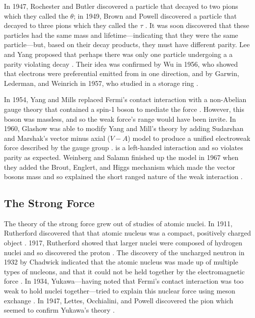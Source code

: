 In 1947, Rochester and Butler discovered a particle that decayed to two pions
which they called the $\theta$; in 1949, Brown and Powell discovered a particle
that decayed to three pions which they called the $\tau$
\cite{Rochester1947}\cite{brown1949}. It was soon discovered that these
particles had the same mass and lifetime---indicating that they were the same
particle---but, based on their decay products, they must have different parity.
Lee and Yang proposed that perhaps there was only one particle undergoing a  a
parity violating decay \cite{lee1956}. Their idea was confirmed by Wu in 1956, who
showed that electrons were preferential emitted from \cobaltsixty in one
direction, and by Garwin, Lederman, and Weinrich in 1957, who studied \pitomunu
in a storage ring \cite{wu1956}\cite{garwin1957}.

In 1954, Yang and Mills replaced Fermi's contact interaction with a non-Abelian
gauge theory that contained a spin-1 boson to mediate the force
\cite{yang1954}. However, this boson was massless, and so the weak force's
range would have been invite. In 1960, Glashow was able to modify Yang and
Mill's theory by adding Sudarshan and Marshak's vector minus axial ($V-A$)
model to produce a unified electroweak force described by the \SUtwoUone gauge
group \cite{glashow1961}\cite{sudarshan1958}. \SUtwo is a left-handed
interaction and so violates parity as expected. Weinberg and Salamn finished up
the model in 1967 when they added the Brout, Englert, and Higgs mechanism which
made the vector bosons mass and so explained the short ranged nature of the
weak interaction
\cite{weinberg1967}\cite{salam1968}\cite{englert1964}\cite{higgs1964}.

\subsection{The Strong Force}
\label{subsection:Strong_force}

The theory of the strong force grew out of studies of atomic nuclei. In 1911,
Rutherford discovered that that atomic nucleus was a compact, positively
charged object \cite{rutherford1911}. 1917, Rutherford showed that larger
nuclei were composed of hydrogen nuclei and so discovered the proton
\cite{rutherford1919}. The discovery of the uncharged neutron in 1932 by
Chadwick indicated that the atomic nucleus was made up of multiple types of
nucleons, and that it could not be held together by the electromagnetic force
\cite{chadwick1932}. In 1934, Yukawa---having noted that Fermi's contact
interaction was too weak to hold nuclei together---tried to explain this
nuclear force using meson exchange \cite{yukawa1935}. In 1947, Lettes,
Occhialini, and Powell discovered the pion which seemed to confirm Yukawa's
theory \cite{lattes1947}.

